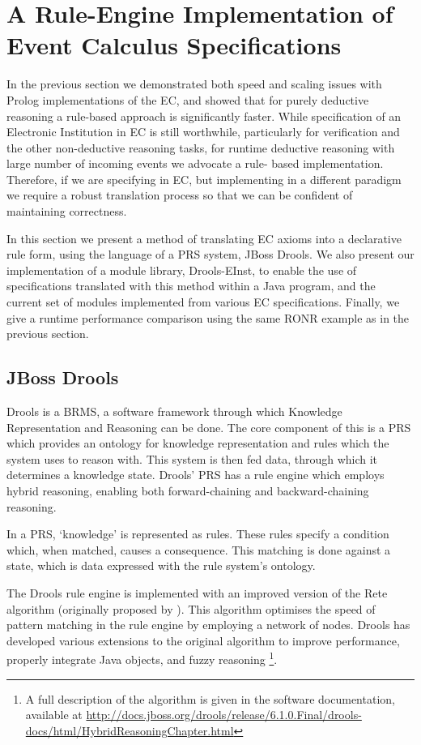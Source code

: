 \section{A Rule-Engine Implementation of Event Calculus Specifications}

In the previous section we demonstrated both speed and scaling issues with
Prolog implementations of the \ac{EC}, and showed that for purely deductive
reasoning a rule-based approach is significantly faster. While specification
of an Electronic Institution in \ac{EC} is still worthwhile, particularly for
verification and the other non-deductive reasoning tasks, for runtime
deductive reasoning with large number of incoming events we advocate a rule-
based implementation. Therefore, if we are specifying in \ac{EC}, but
implementing in a different paradigm we require a robust translation process
so that we can be confident of maintaining correctness.

In this section we present a method of translating \ac{EC} axioms into a
declarative rule form, using the language of a \acl{PRS} system, JBoss Drools.
We also present our implementation of a module library, Drools-EInst, to
enable the use of specifications translated with this method within a Java
program, and the current set of modules implemented from various \ac{EC}
specifications. Finally, we give a runtime performance comparison using the
same \ac{RONR} example as in the previous section.

\subsection{JBoss Drools}

Drools is a \ac{BRMS}, a software framework through which Knowledge
Representation and Reasoning can be done. The core component of this is a \ac{PRS}
which provides an ontology for knowledge representation and rules which the system
uses to reason with. This system is then fed data, through which it determines a
knowledge state. Drools' \ac{PRS} has a rule engine which employs hybrid reasoning,
enabling both forward-chaining and backward-chaining reasoning.

In a \ac{PRS}, `knowledge' is represented as rules. These rules specify a
condition which, when matched, causes a consequence. This matching is done
against a state, which is data expressed with the rule system's ontology. 

The Drools rule engine is implemented with an improved version of the Rete
algorithm (originally proposed by \citet{Forgy1982}). This algorithm optimises
the speed of pattern matching in the rule engine by employing a network of
nodes. Drools has developed various extensions to the original algorithm to
improve performance, properly integrate Java objects, and fuzzy reasoning
\footnote{A full description of the algorithm is given in the software
documentation, available at \url{http://docs.jboss.org/drools/release/6.1.0.Final/drools-docs/html/HybridReasoningChapter.html}}.

